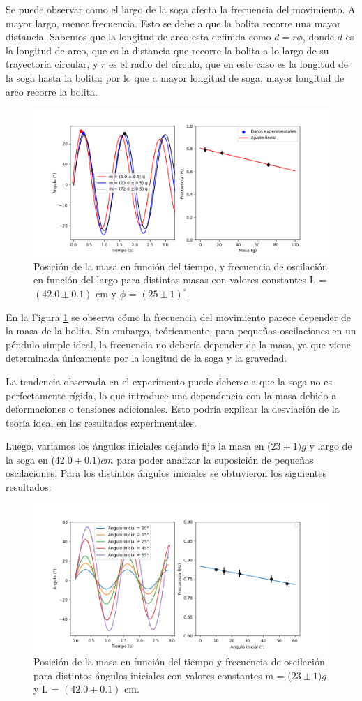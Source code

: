 \documentclass[12pt,a4]{article}
\begin{document}
Se puede observar como el largo de la soga afecta la frecuencia del movimiento. A mayor largo, menor frecuencia. Esto se debe a que la bolita recorre una mayor distancia. Sabemos que la longitud de arco esta definida como $d = r \phi$, donde $d$ es la longitud de arco, que es la distancia que recorre la bolita a lo largo de su trayectoria circular, y $r$ es el radio del círculo, que en este caso es la longitud de la soga hasta la bolita; por lo que a mayor longitud de soga, mayor longitud de arco recorre la bolita.

\begin{figure}[H]
    \centering
    \includegraphics[width=0.6\linewidth]{peso.png}
    \caption{Posición de la masa en función del tiempo, y frecuencia de oscilación en función del largo para distintas masas con valores constantes L = $(42.0 \pm 0.1)$ cm y $\phi$ = $(25 \pm 1) ^\circ$.}
    \label{fig:masa}
\end{figure}

En la Figura \ref{fig:masa} se observa cómo la frecuencia del movimiento parece depender de la masa de la bolita. Sin embargo, teóricamente, para pequeñas oscilaciones en un péndulo simple ideal, la frecuencia no debería depender de la masa, ya que viene determinada únicamente por la longitud de la soga y la gravedad.

La tendencia observada en el experimento puede deberse a que la soga no es perfectamente rígida, lo que introduce una dependencia con la masa debido a deformaciones o tensiones adicionales. Esto podría explicar la desviación de la teoría ideal en los resultados experimentales.

Luego, variamos los ángulos iniciales dejando fijo la masa en ($23 \pm 1) g$ y largo de la soga en ($42.0 \pm 0.1) cm$ para poder analizar la suposición de pequeñas oscilaciones. Para los distintos ángulos iniciales se obtuvieron los siguientes resultados:

\begin{figure}[H]
    \centering
    \includegraphics[width=0.6\linewidth]{angulos.png}
    \caption{Posición de la masa en función del tiempo y frecuencia de oscilación para distintos ángulos iniciales con valores constantes m = ($23 \pm 1) g$ y L = $(42.0\pm0.1)$ cm.}
    \label{fig:angulos}
\end{figure}
\end{document}
